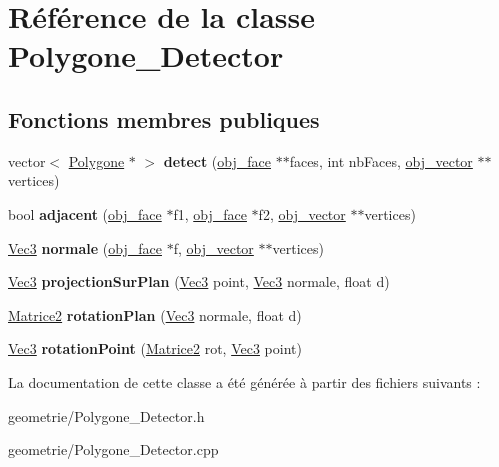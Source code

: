 \hypertarget{class_polygone___detector}{\section{Référence de la classe Polygone\-\_\-\-Detector}
\label{class_polygone___detector}
}
\subsection*{Fonctions membres publiques}
\begin{DoxyCompactItemize}
\item 
\hypertarget{class_polygone___detector_aca8d6e66f98067564e2d89032dca8539}{vector$<$ \hyperlink{class_polygone}{Polygone} $\ast$ $>$ {\bfseries detect} (\hyperlink{structobj__face}{obj\-\_\-face} $\ast$$\ast$faces, int nb\-Faces, \hyperlink{structobj__vector}{obj\-\_\-vector} $\ast$$\ast$vertices)}\label{class_polygone___detector_aca8d6e66f98067564e2d89032dca8539}

\item 
\hypertarget{class_polygone___detector_ab3c854f90317ccc1b445643304be6e03}{bool {\bfseries adjacent} (\hyperlink{structobj__face}{obj\-\_\-face} $\ast$f1, \hyperlink{structobj__face}{obj\-\_\-face} $\ast$f2, \hyperlink{structobj__vector}{obj\-\_\-vector} $\ast$$\ast$vertices)}\label{class_polygone___detector_ab3c854f90317ccc1b445643304be6e03}

\item 
\hypertarget{class_polygone___detector_a2ca3c644fc9d2689f2f199e1a596fafc}{\hyperlink{class_vec3}{Vec3} {\bfseries normale} (\hyperlink{structobj__face}{obj\-\_\-face} $\ast$f, \hyperlink{structobj__vector}{obj\-\_\-vector} $\ast$$\ast$vertices)}\label{class_polygone___detector_a2ca3c644fc9d2689f2f199e1a596fafc}

\item 
\hypertarget{class_polygone___detector_a47d32fe7b7450031a6bc41529560329c}{\hyperlink{class_vec3}{Vec3} {\bfseries projection\-Sur\-Plan} (\hyperlink{class_vec3}{Vec3} point, \hyperlink{class_vec3}{Vec3} normale, float d)}\label{class_polygone___detector_a47d32fe7b7450031a6bc41529560329c}

\item 
\hypertarget{class_polygone___detector_aa28bd09061ce54fd4e18e490086e9477}{\hyperlink{class_matrice2}{Matrice2} {\bfseries rotation\-Plan} (\hyperlink{class_vec3}{Vec3} normale, float d)}\label{class_polygone___detector_aa28bd09061ce54fd4e18e490086e9477}

\item 
\hypertarget{class_polygone___detector_a028d287dfc4e16db3c6cd14c204e00da}{\hyperlink{class_vec3}{Vec3} {\bfseries rotation\-Point} (\hyperlink{class_matrice2}{Matrice2} rot, \hyperlink{class_vec3}{Vec3} point)}\label{class_polygone___detector_a028d287dfc4e16db3c6cd14c204e00da}

\end{DoxyCompactItemize}


La documentation de cette classe a été générée à partir des fichiers suivants \-:\begin{DoxyCompactItemize}
\item 
geometrie/Polygone\-\_\-\-Detector.\-h\item 
geometrie/Polygone\-\_\-\-Detector.\-cpp\end{DoxyCompactItemize}
